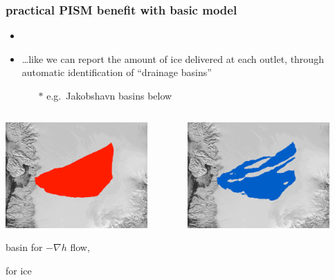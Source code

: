 \documentclass[hide notes,intlimits]{beamer}
\begin{document}
\begin{frame}
  \frametitle{practical PISM benefit with basic model}
 
\begin{itemize}
\item  {}
\item \dots like we can report the amount of ice delivered at each outlet, through automatic identification of ``drainage basins''
  \begin{itemize}
  \item[$\ast$] e.g.~Jakobshavn basins below
  \end{itemize}
\end{itemize}

\vspace{-5mm}

\begin{columns}
\begin{column}{0.5\textwidth}
\begin{center}
\includegraphics[width=0.85\textwidth]{figs/ftt-mask}

basin for $-\nabla h$ flow,

\phantom{where $\phi$}

for ice
\end{center}
\end{column}
\begin{column}{0.5\textwidth}
\begin{center}
\vspace{0.5mm}

\includegraphics[width=0.85\textwidth]{figs/hydro-mask}


\end{center}
\end{column}
\end{columns}
\end{frame}
\end{document}
